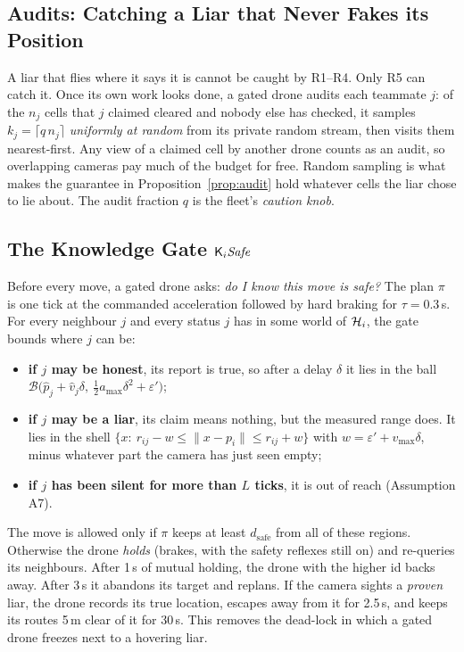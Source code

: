 \subsection{Audits: Catching a Liar that Never Fakes its Position}

A liar that flies where it says it is cannot be caught by R1--R4. Only R5 can catch it. Once its own work looks done, a
gated drone audits each teammate $j$: of the $n_j$ cells that $j$ claimed cleared and nobody else has checked, it
samples $k_j=\lceil q\,n_j\rceil$ \emph{uniformly at random} from its private random stream, then visits them
nearest-first. Any view of a claimed cell by another drone counts as an audit, so overlapping cameras pay much of the
budget for free. Random sampling is what makes the guarantee in Proposition~\ref{prop:audit} hold whatever cells the liar
chose to lie about. The audit fraction $q$ is the fleet's \emph{caution knob}.

\subsection{The Knowledge Gate \texorpdfstring{$\mathsf{K}_i\mathit{Safe}$}{K\_i Safe}}
\label{sec:gate}

Before every move, a gated drone asks: \emph{do I know this move is safe?} The plan $\pi$ is one tick at the commanded
acceleration followed by hard braking for $\tau=0.3$\,s. For every neighbour $j$ and every status $j$ has in some world
of $\mathcal{H}_i$, the gate bounds where $j$ can be:
\begin{itemize}
    \item \textbf{if $j$ may be honest}, its report is true, so after a delay $\delta$ it lies in the ball
          $\mathcal{B}\big(\hat p_j+\hat v_j\delta,\ \tfrac12 a_{\max}\delta^2+\varepsilon'\big)$;
    \item \textbf{if $j$ may be a liar}, its claim means nothing, but the measured range does. It lies in the shell
          $\{x:\ r_{ij}-w\le\|x-p_i\|\le r_{ij}+w\}$ with $w=\varepsilon'+v_{\max}\delta$, minus whatever part the
          camera has just seen empty;
    \item \textbf{if $j$ has been silent for more than $L$ ticks}, it is out of reach (Assumption A7).
\end{itemize}
The move is allowed only if $\pi$ keeps at least $d_{\mathrm{safe}}$ from all of these regions. Otherwise the drone
\emph{holds} (brakes, with the safety reflexes still on) and re-queries its neighbours. After 1\,s of mutual holding, the
drone with the higher id backs away. After 3\,s it abandons its target and replans. If the camera sights a
\emph{proven} liar, the drone records its true location, escapes away from it for 2.5\,s, and keeps its routes 5\,m clear
of it for 30\,s. This removes the dead-lock in which a gated drone freezes next to a hovering liar.

